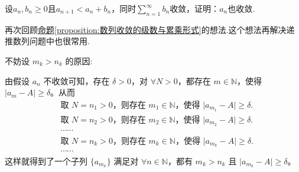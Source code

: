 \documentclass[../../main.tex]{subfiles}%
\begin{document}
\begin{example}
设\(a_n,b_n\geqslant 0\)且\(a_{n + 1}<a_n + b_n\)，同时\(\sum_{n = 1}^{\infty}b_n\)收敛，证明：\(a_n\)也收敛.
\end{example}
\begin{note}
再次回顾\hyperref[proposition:数列收敛的级数与累乘形式]{命题\ref{proposition:数列收敛的级数与累乘形式}}的想法.这个想法再解决递推数列问题中也很常用.
\end{note}
\begin{remark}
\hypertarget{example4.58不妨设的原因}{不妨设 \(m_k > n_k\) 的原因:}由假设 \(a_n\) 不收敛可知，存在 \(\delta > 0\)，对 \(\forall N > 0\)，都存在 \(m \in \mathbb{N}\)，使得 \(\vert a_m - A \vert \geqslant \delta\)。从而
\begin{align*}
&\text{取 }N = n_1 > 0\text{，则存在 }m_1 \in \mathbb{N}\text{，使得 }\vert a_{m_1} - A \vert \geqslant \delta.\\
&\text{取 }N = n_2 > 0\text{，则存在 }m_2 \in \mathbb{N}\text{，使得 }\vert a_{m_2} - A \vert \geqslant \delta.\\
&\cdots\cdots\\
&\text{取 }N = n_k > 0\text{，则存在 }m_k \in \mathbb{N}\text{，使得 }\vert a_{m_k} - A \vert \geqslant \delta.\\
&\cdots\cdots
\end{align*}
这样就得到了一个子列 \(\{ a_{m_k} \}\) 满足对 \(\forall n \in \mathbb{N}\)，都有 \(m_k > n_k\) 且 \(\vert a_{m_k} - A \vert \geqslant \delta\)。
\end{remark}
\end{document}
